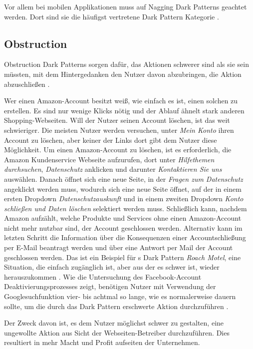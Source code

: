 \documentclass[conference,compsoc,final,a4paper]{IEEEtran}
\begin{document}
Vor allem bei mobilen Applikationen muss auf Nagging Dark Patterns geachtet werden. Dort sind sie die häufigst vertretene Dark Pattern Kategorie \autocite{DiGeronimo2020}.

\subsection{Obstruction}
\label{chap:Obstruction}
Obstruction Dark Patterns sorgen dafür, das Aktionen schwerer sind als sie sein müssten, mit dem Hintergedanken den Nutzer davon abzubringen, die Aktion abzuschließen \autocite{Gray_2018}.

Wer einen Amazon-Account besitzt weiß, wie einfach es ist, einen solchen zu erstellen. Es sind nur wenige Klicks nötig und der Ablauf ähnelt stark anderen Shopping-Webseiten. Will der Nutzer seinen Account löschen, ist das weit schwieriger. Die meisten Nutzer werden versuchen, unter \textit{Mein Konto} ihren Account zu löschen, aber keiner der Links dort gibt dem Nutzer diese Möglichkeit. Um einen Amazon-Account zu löschen, ist es erforderlich, die Amazon Kundenservice Webseite aufzurufen, dort unter \textit{Hilfethemen durchsuchen}, \textit{Datenschutz} anklicken und darunter \textit{Kontaktieren Sie uns} auswählen. Danach öffnet sich eine neue Seite, in der \textit{Fragen zum Datenschutz} angeklickt werden muss, wodurch sich eine neue Seite öffnet, auf der in einem ersten Dropdown \textit{Datenschutzauskunft} und in einem zweiten Dropdown \textit{Konto schließen und Daten löschen} selektiert werden muss. Schließlich kann, nachdem Amazon aufzählt, welche Produkte und Services ohne einen Amazon-Account nicht mehr nutzbar sind, der Account geschlossen werden. Alternativ kann im letzten Schritt die Information über die Konsequenzen einer Accountschließung per E-Mail beantragt werden und über eine Antwort per Mail der Account geschlossen werden. Das ist ein Beispiel für \citeauthor{Brignull}s Dark Pattern \textit{Roach Motel}, eine Situation, die einfach zugänglich ist, aber aus der es schwer ist, wieder herauszukommen \autocite{Brignull}. Wie die Untersuchung des Facebook-Account Deaktivierungsprozesses zeigt, benötigen Nutzer mit Verwendung der Googlesuchfunktion vier- bis achtmal so lange, wie es normalerweise dauern sollte, um die durch das Dark Pattern erschwerte Aktion durchzuführen \autocite{M.Bhoot2020}.

Der Zweck davon ist, es dem Nutzer möglichst schwer zu gestalten, eine ungewollte Aktion aus Sicht der Webseiten-Betreiber durchzuführen. Dies resultiert in mehr Macht und Profit aufseiten der Unternehmen.
\end{document}
